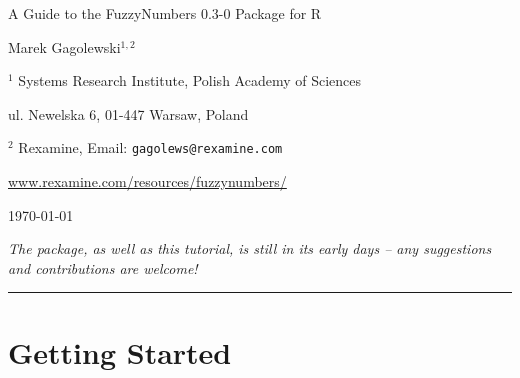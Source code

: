 \documentclass[11pt]{article}\usepackage{graphicx, color}
\newcommand{\hlnumber}[1]{\textcolor[rgb]{0,0,0}{#1}}%
\newcommand{\hlfunctioncall}[1]{\textcolor[rgb]{0.501960784313725,0,0.329411764705882}{\textbf{#1}}}%
\newcommand{\hlstring}[1]{\textcolor[rgb]{0.6,0.6,1}{#1}}%
\newcommand{\hlkeyword}[1]{\textcolor[rgb]{0,0,0}{\textbf{#1}}}%
\newcommand{\hlargument}[1]{\textcolor[rgb]{0.690196078431373,0.250980392156863,0.0196078431372549}{#1}}%
\newcommand{\hlcomment}[1]{\textcolor[rgb]{0.180392156862745,0.6,0.341176470588235}{#1}}%
\newcommand{\hlroxygencomment}[1]{\textcolor[rgb]{0.43921568627451,0.47843137254902,0.701960784313725}{#1}}%
\newcommand{\hlformalargs}[1]{\textcolor[rgb]{0.690196078431373,0.250980392156863,0.0196078431372549}{#1}}%
\newcommand{\hleqformalargs}[1]{\textcolor[rgb]{0.690196078431373,0.250980392156863,0.0196078431372549}{#1}}%
\newcommand{\hlassignement}[1]{\textcolor[rgb]{0,0,0}{\textbf{#1}}}%
\newcommand{\hlpackage}[1]{\textcolor[rgb]{0.588235294117647,0.709803921568627,0.145098039215686}{#1}}%
\newcommand{\hlslot}[1]{\textit{#1}}%
\newcommand{\hlsymbol}[1]{\textcolor[rgb]{0,0,0}{#1}}%
\newcommand{\hlprompt}[1]{\textcolor[rgb]{0.2,0.2,0.2}{#1}}%
\newcommand{\package}[1]{\textsf{#1}\xspace}
\newcommand{\lang}[1]{\textsf{#1}\xspace}
\newcommand{\R}{\lang{R}}
\begin{document}
\begin{center}
{\LARGE\sf A Guide to the \package{FuzzyNumbers} {0.3-0} Package for \R}

\bigskip
{\large Marek Gagolewski${}^{1,2}$}

${}^{1}$ Systems Research Institute, Polish Academy of Sciences

ul. Newelska 6, 01-447 Warsaw, Poland

${}^{2}$ Rexamine, Email: \texttt{gagolews@rexamine.com}

\href{http://www.rexamine.com/resources/fuzzynumbers/}%
{www.rexamine.com/resources/fuzzynumbers/}

\bigskip
\today



\medskip
\textit{The package, as well as this tutorial, is still in its early
days -- any suggestions and contributions are welcome!}
\end{center}





\bigskip\hrule\bigskip
\tableofcontents









\section{Getting Started}
\end{document}

